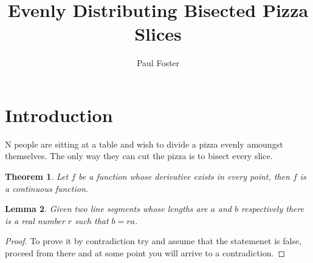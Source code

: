 \documentclass{article}
\title{Evenly Distributing Bisected Pizza Slices}
\author{Paul Foster}
\begin{document}
\maketitle

\newtheorem{theorem}{Theorem}
\newtheorem{corollary}{Corollary}[theorem]
\newtheorem{lemma}[theorem]{Lemma}

\section{Introduction}
N people are sitting at a table and wish to divide a pizza evenly amoungst themselves. The only way they can cut the pizza is to bisect every slice.

\begin{theorem}
Let $f$ be a function whose derivative exists in every point, then $f$
is a continuous function.
\end{theorem}

\begin{lemma}
Given two line segments whose lengths are $a$ and $b$ respectively there
is a real number $r$ such that $b=ra$.
\end{lemma}

\begin{proof}
To prove it by contradiction try and assume that the statemenet is false,
proceed from there and at some point you will arrive to a contradiction.
\end{proof}
\end{document}
